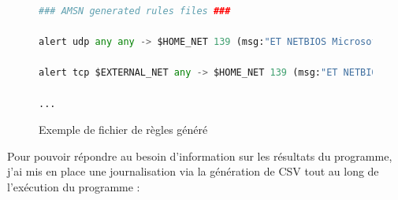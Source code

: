\begin{figure}[h]%
    \center%
\begin{lstlisting}[language=Python]
### AMSN generated rules files ###

alert udp any any -> $HOME_NET 139 (msg:"ET NETBIOS Microsoft Windows NETAPI Stack Overflow Inbound - MS08-067 (1)"; content:"|0B|"; offset:2; depth:1; content:"|C8 4F 32 4B 70 16 D3 01 12 78 5A 47 BF 6E E1 88|"; reference:url,www.microsoft.com/technet/security/Bulletin/MS08-067.mspx; reference:cve,2008-4250; reference:url,www.kb.cert.org/vuls/id/827267; classtype:attempted-admin; sid:2008690; rev:5;  metadata: amsn_source gcenter_netbios, created_at 2010_07_30, cve CVE_2008_4250, updated_at 2017_11_22;)

alert tcp $EXTERNAL_NET any -> $HOME_NET 139 (msg:"ET NETBIOS Microsoft SMB NetLogon UUID detected Big Endian SET"; flow:to_server,established; content:"|ff|SMB"; content:"|05 00 0b|"; distance:0; byte_test:1,!&,0x10,1,relative; content:"|12345678 1234 abcd ef00 01234567cffb|"; distance:29; flowbits:set,smb.netlogon.uuid.detected; flowbits:noalert; reference:cve,2010-2742; reference:url,www.microsoft.com/technet/security/bulletin/MS10-101.mspx; classtype:attempted-user; sid:2800985; rev:2;  metadata: amsn_source gcenter_netbios, created_at 2010_12_15, cve CVE_2010_2742, updated_at 2017_11_22;)

...
\end{lstlisting}
    \caption[Exemple de fichier de règles généré]{Exemple de fichier de règles généré}\label{fig:captureOIVrules}
\end{figure}

\vspace{1em}

Pour pouvoir répondre au besoin d'information sur les résultats du programme, j'ai mis en place une journalisation via la génération de CSV tout au long de l'exécution du programme :\\

\vspace{1em}

